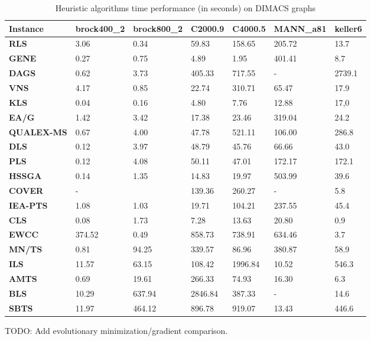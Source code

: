 \begin{table}[!ht]
    \centering
    \begin{tabular}{|l|l|l|l|l|l|l|}
    \hline
        \textbf{Instance} & \textbf{brock400\_2} & \textbf{brock800\_2} & \textbf{C2000.9} & \textbf{C4000.5} & \textbf{MANN\_a81} & \textbf{keller6} \\ \hline
        \textbf{RLS} & 3.06 & 0.34 & 59.83 & 158.65 & 205.72 & 13.7 \\ \hline
        \textbf{GENE} & 0.27 & 0.75 & 4.89 & 1.95 & 401.41 & 8.7 \\ \hline
        \textbf{DAGS} & 0.62 & 3.73 & 405.33 & 717.55 & - & 2739.1 \\ \hline
        \textbf{VNS} & 4.17 & 0.85 & 22.74 & 310.71 & 65.47 & 17.9 \\ \hline
        \textbf{KLS} & 0.04 & 0.16 & 4.80 & 7.76 & 12.88 & 17,0 \\ \hline
        \textbf{EA/G} & 1.42 & 3.42 & 17.38 & 23.46 & 319.04 & 24.2 \\ \hline
        \textbf{QUALEX-MS} & 0.67 & 4.00 & 47.78 & 521.11 & 106.00 & 286.8 \\ \hline
        \textbf{DLS} & 0.12 & 3.97 & 48.79 & 45.76 & 66.66 & 43.0 \\ \hline
        \textbf{PLS} & 0.12 & 4.08 & 50.11 & 47.01 & 172.17 & 172.1 \\ \hline
        \textbf{HSSGA} & 0.14 & 1.35 & 14.83 & 19.97 & 503.99 & 39.6 \\ \hline
        \textbf{COVER} & - & ~ & 139.36 & 260.27 & - & 5.8 \\ \hline
        \textbf{IEA-PTS} & 1.08 & 1.03 & 19.71 & 104.21 & 237.55 & 45.4 \\ \hline
        \textbf{CLS} & 0.08 & 1.73 & 7.28 & 13.63 & 20.80 & 0.9 \\ \hline
        \textbf{EWCC} & 374.52 & 0.49 & 858.73 & 738.91 & 634.46 & 3.7 \\ \hline
        \textbf{MN/TS} & 0.81 & 94.25 & 339.57 & 86.96 & 380.87 & 58.9 \\ \hline
        \textbf{ILS} & 11.57 & 63.15 & 108.42 & 1996.84 & 10.52 & 546.3 \\ \hline
        \textbf{AMTS} & 0.69 & 19.61 & 266.33 & 74.93 & 16.30 & 6.3 \\ \hline
        \textbf{BLS} & 10.29 & 637.94 & 2846.84 & 387.33 & - & 14.6 \\ \hline
        \textbf{SBTS} & 11.97 & 464.12 & 896.78 & 919.07 & 13.43 & 446.6 \\ \hline
    \end{tabular}
    \caption{Heuristic algorithms time performance (in seconds) on DIMACS graphs}
    \label{table:heuristic_algorithms_performance}
\end{table}

TODO: Add evolutionary minimization/gradient comparison.